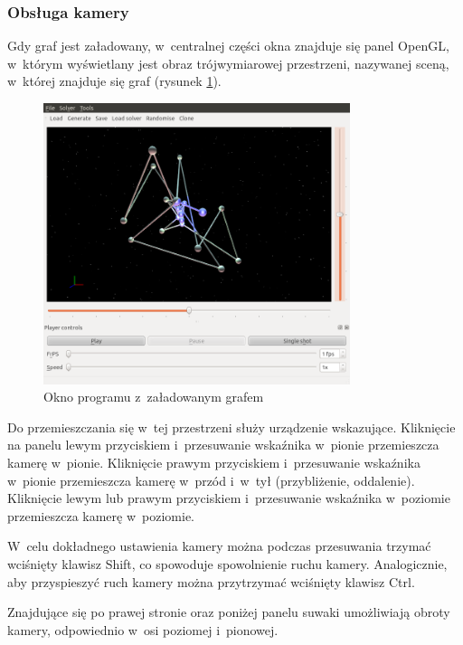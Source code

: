 \documentclass[a4paper,onecolumn,oneside,12pt]{mwart}
\begin{document}
\subsubsection{Obsługa kamery}

Gdy graf jest załadowany, w~centralnej części okna znajduje się panel
OpenGL, w~którym wyświetlany jest obraz trójwymiarowej przestrzeni,
nazywanej sceną, w~której znajduje się graf (rysunek \ref{fig:scr:loaded}).

\begin{figure}[tpb]
	\begin{center}
		\includegraphics[width=0.8\textwidth]{screenshots/loaded.png}
	\end{center}
	\caption{Okno programu z~załadowanym grafem}
	\label{fig:scr:loaded}
\end{figure}

Do przemieszczania się w~tej przestrzeni służy urządzenie wskazujące.
Kliknięcie na panelu lewym przyciskiem i~przesuwanie wskaźnika w~pionie
przemieszcza kamerę w~pionie. Kliknięcie prawym przyciskiem i~przesuwanie
wskaźnika w~pionie przemieszcza kamerę w~przód i~w~tył
(przybliżenie, oddalenie). Kliknięcie lewym lub prawym przyciskiem
i~przesuwanie wskaźnika w~poziomie przemieszcza kamerę w~poziomie.

W~celu dokładnego ustawienia kamery można podczas przesuwania trzymać
wciśnięty klawisz Shift, co spowoduje spowolnienie ruchu kamery.
Analogicznie, aby przyspieszyć ruch kamery można przytrzymać wciśnięty
klawisz Ctrl.

Znajdujące się po prawej stronie oraz poniżej panelu suwaki umożliwiają
obroty kamery, odpowiednio w~osi poziomej i~pionowej.
\end{document}

